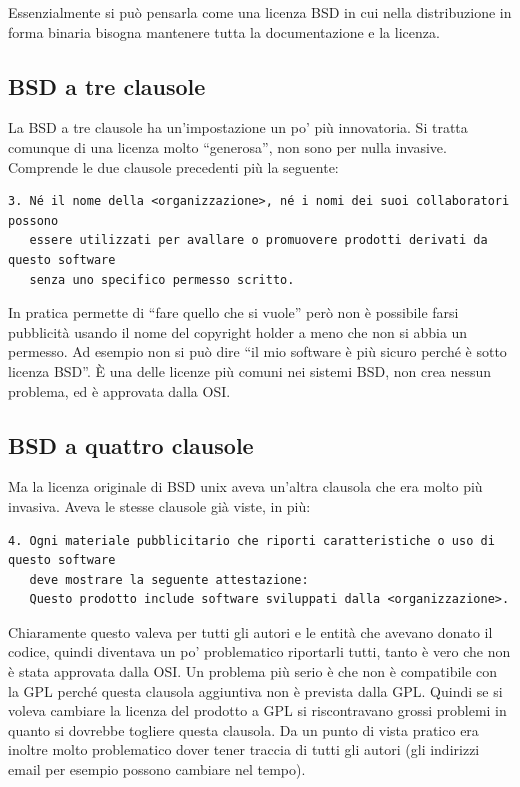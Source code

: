 \noindent Essenzialmente si può pensarla come una licenza BSD in cui nella distribuzione in forma binaria bisogna mantenere tutta la documentazione e la licenza. 

\subsection{BSD a tre clausole}

La BSD a tre clausole ha un'impostazione un po' più innovatoria. Si tratta comunque di una licenza molto ``generosa'', non sono per nulla invasive. Comprende le due clausole precedenti più la seguente:

 \begin{lstlisting}[caption=BSD a tre clausole]
3. Né il nome della <organizzazione>, né i nomi dei suoi collaboratori possono 
   essere utilizzati per avallare o promuovere prodotti derivati da questo software
   senza uno specifico permesso scritto.
\end{lstlisting} 

\noindent In pratica permette di ``fare quello che si vuole'' però non è possibile farsi pubblicità usando il nome del copyright holder a meno che non si abbia un permesso. Ad esempio non si può dire ``il mio software è più sicuro perché è sotto licenza BSD''. È una delle licenze più comuni nei sistemi BSD, non crea nessun problema, ed è approvata dalla OSI.

\subsection{BSD a quattro clausole}

Ma la licenza originale di BSD unix aveva un'altra clausola che era molto più invasiva. Aveva le stesse clausole già viste, in più:

\begin{lstlisting}[caption=BSD a quattro clausole] 
4. Ogni materiale pubblicitario che riporti caratteristiche o uso di questo software
   deve mostrare la seguente attestazione:
   Questo prodotto include software sviluppati dalla <organizzazione>.
\end{lstlisting}

\noindent Chiaramente questo valeva per tutti gli autori e le entità che avevano donato il codice, quindi diventava un po' problematico riportarli tutti, tanto è vero che non è stata approvata dalla OSI. Un problema più serio è che non è compatibile con la GPL perché questa clausola aggiuntiva non è prevista dalla GPL. Quindi se si voleva cambiare la licenza del prodotto a GPL si riscontravano grossi problemi in quanto si dovrebbe togliere questa clausola. Da un punto di vista pratico era inoltre molto problematico dover tener traccia di tutti gli autori (gli indirizzi email per esempio possono cambiare nel tempo).

